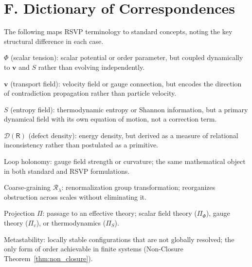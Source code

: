 \documentclass[12pt,a4paper,openany]{book}
\theoremstyle{plain}
\theoremstyle{definition}
\theoremstyle{remark}
\begin{document}
\section*{F. Dictionary of Correspondences}
\label{app:glossary}

The following maps RSVP terminology to standard concepts, noting the key structural difference in each case.

\medskip\noindent$\Phi$ (scalar tension): scalar potential or order parameter, but coupled dynamically to $\mathbf{v}$ and $S$ rather than evolving independently.

\noindent$\mathbf{v}$ (transport field): velocity field or gauge connection, but encodes the direction of contradiction propagation rather than particle velocity.

\noindent$S$ (entropy field): thermodynamic entropy or Shannon information, but a primary dynamical field with its own equation of motion, not a correction term.

\noindent$\mathcal{D}(\mathsf{R})$ (defect density): energy density, but derived as a measure of relational inconsistency rather than postulated as a primitive.

\noindent Loop holonomy: gauge field strength or curvature; the same mathematical object in both standard and RSVP formulations.

\noindent Coarse-graining $\mathcal{R}_\lambda$: renormalization group transformation; reorganizes obstruction across scales without eliminating it.

\noindent Projection $\Pi$: passage to an effective theory; scalar field theory ($\Pi_\Phi$), gauge theory ($\Pi_v$), or thermodynamics ($\Pi_S$).

\noindent Metastability: locally stable configurations that are not globally resolved; the only form of order achievable in finite systems (Non-Closure Theorem~\ref{thm:non_closure}).




\end{document}
